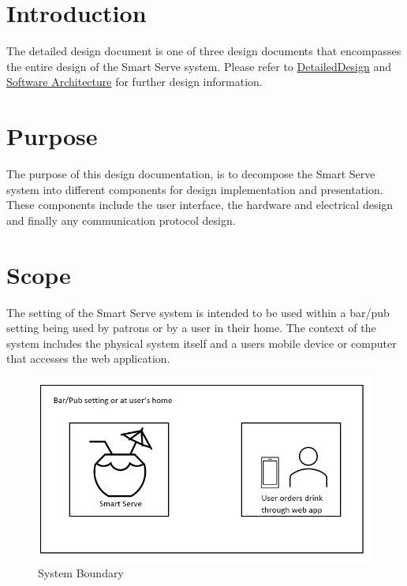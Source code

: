 \documentclass[12pt, titlepage]{article}
\begin{document}
\listoftables

\listoffigures

\newpage


\section{Introduction}
The detailed design document is one of three design documents that encompasses the entire design of the Smart Serve system. Please refer to \href{https://github.com/purefisher/Smart-Serve/blob/main/docs/Design/DetailedDesign.pdf}{DetailedDesign} and \href{https://github.com/purefisher/Smart-Serve/blob/main/docs/Design/DetailedDesi.pdf}{Software Architecture} for further design information.
\section{Purpose}
The purpose of this design documentation, is to decompose the Smart Serve system into different components for design implementation and presentation. These components include the user interface, the hardware and electrical design and finally any communication protocol design. 

\section{Scope}
The setting of the Smart Serve system is intended to be used within a bar/pub setting being used by patrons or by a user in their home. The context of the system includes the physical system itself and a users mobile device or computer that accesses the web application.    
\begin{figure}[H]
    \centerline{\includegraphics[scale=.5]{systemboundary.png}}
    \caption{System Boundary}
    \label{fig}
\end{figure}
\end{document}
